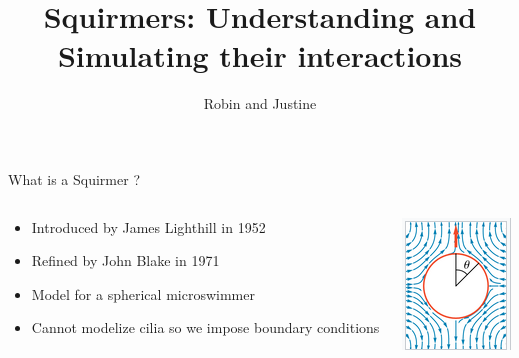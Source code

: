 \documentclass{beamer}
\title{Squirmers: Understanding and Simulating their interactions}
\author{Robin and Justine}
\begin{document}
\begin{frame}
    \titlepage
\end{frame}

\begin{frame}{What is a Squirmer ?}
    \begin{columns}[T]
        \begin{column}{0.5\textwidth}
            \begin{itemize}
                \item Introduced by James Lighthill in 1952
                \item Refined by John Blake in 1971
                \item Model for a spherical microswimmer
                \item Cannot modelize cilia so we impose boundary conditions
            \end{itemize}
        \end{column}
        \begin{column}{0.5\textwidth}
            \centering
            \includegraphics[width=\textwidth]{images/squirmer.png}
        \end{column}
    \end{columns}
\end{frame}
\end{document}
